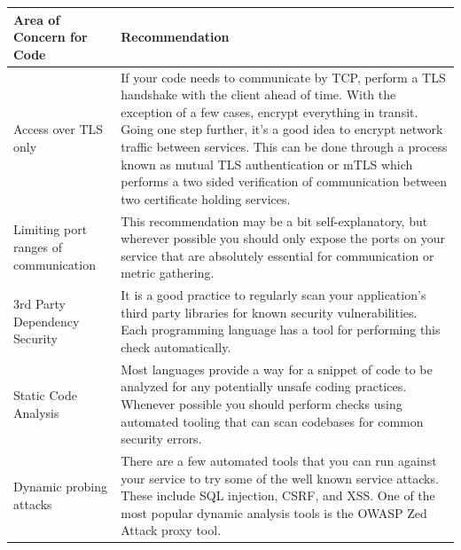 \begin{enumerate}
\begin{center}
    \begin{tabular}{ | m{16em} | m{16em} | } 
     \hline
     \textbf{Area of Concern for Code} & \textbf{Recommendation} \\ 
     \hline
     Access over TLS only & If your code needs to communicate by TCP, perform a TLS handshake with the client ahead of time. With the exception of a few cases, encrypt everything in transit. Going one step further, it's a good idea to encrypt network traffic between services. This can be done through a process known as mutual TLS authentication or mTLS which performs a two sided verification of communication between two certificate holding services. \\ 
     \hline
     Limiting port ranges of communication & This recommendation may be a bit self-explanatory, but wherever possible you should only expose the ports on your service that are absolutely essential for communication or metric gathering. \\ 
     \hline
     3rd Party Dependency Security & It is a good practice to regularly scan your application's third party libraries for known security vulnerabilities. Each programming language has a tool for performing this check automatically. \\
     \hline
     Static Code Analysis & Most languages provide a way for a snippet of code to be analyzed for any potentially unsafe coding practices. Whenever possible you should perform checks using automated tooling that can scan codebases for common security errors. \\
     \hline
     Dynamic probing attacks & There are a few automated tools that you can run against your service to try some of the well known service attacks. These include SQL injection, CSRF, and XSS. One of the most popular dynamic analysis tools is the OWASP Zed Attack proxy tool. \\
     \hline
    \end{tabular}
\end{center}   
                      
\end{enumerate}